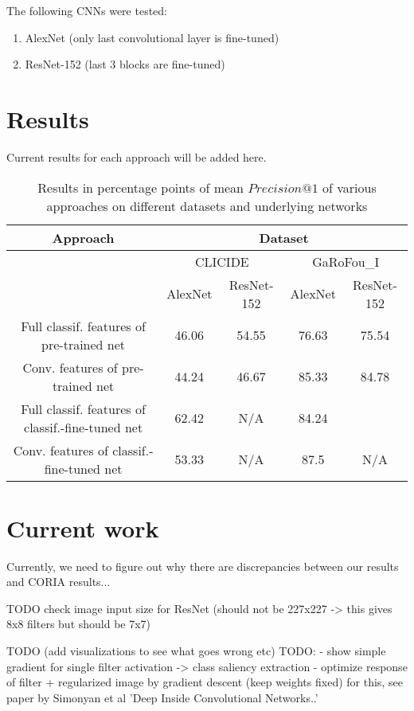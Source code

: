 \documentclass[fleqn]{article}
\begin{document}
The following CNNs were tested:
\begin{enumerate}
    \item AlexNet (only last convolutional layer is fine-tuned)
    \item ResNet-152 (last 3 blocks are fine-tuned)
\end{enumerate}

\section{Results}
Current results for each approach will be added here.

\begin{table}
\begin{tabular}{|c|c|c||c|c|}
\hline
Approach & \multicolumn{4}{|c|}{Dataset}\\
\hline
& \multicolumn{2}{|c||}{CLICIDE} & \multicolumn{2}{|c|}{GaRoFou\_I}\\
\hline
& AlexNet & ResNet-152 & AlexNet & ResNet-152\\
\hline
Full classif. features of pre-trained net
& 46.06 & 54.55 & 76.63 & 75.54 \\
\hline
Conv. features of pre-trained net
& 44.24 & 46.67 & 85.33 & 84.78 \\
\hline
Full classif. features of classif.-fine-tuned net
& 62.42 & N/A & 84.24 &  \\
\hline
Conv. features of classif.-fine-tuned net
& 53.33 & N/A & 87.5 & N/A \\
\hline
\end{tabular}
\caption{Results in percentage points of mean $Precision@1$ of various approaches on different datasets and underlying networks}
\end{table}

\section{Current work}
Currently, we need to figure out why there are discrepancies between
our results and CORIA results...

TODO check image input size for ResNet (should not be 227x227 -> this gives 8x8 filters but should be 7x7)

TODO (add visualizations to see what goes wrong etc)
TODO:
- show simple gradient for single filter activation -> class saliency
extraction
- optimize response of filter + regularized image by gradient descent
(keep weights fixed)
for this, see paper by Simonyan et al 'Deep Inside Convolutional Networks..'
\end{document}
